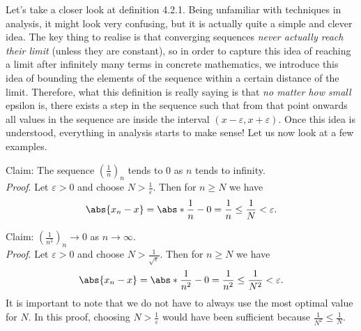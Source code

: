 \documentclass[../real_analysis.tex]{subfiles}
\begin{document}
            Let's take a closer look at definition 4.2.1. Being unfamiliar with techniques in analysis, it might look very confusing, but it is actually quite a simple and clever idea. The key thing to realise is that converging sequences \textit{never actually reach their limit} (unless they are constant), so in order to capture this idea of reaching a limit after infinitely many terms in concrete mathematics, we introduce this idea of bounding the elements of the sequence within a certain distance of the limit. Therefore, what this definition is really saying is that \textit{no matter how small} epsilon is, there exists a step in the sequence such that from that point onwards all values in the sequence are inside the interval $(x-\varepsilon,x+\varepsilon)$.
            Once this idea is understood, everything in analysis starts to make sense! Let us now look at a few examples.
            \begin{example}
                Claim: The sequence $\left(\frac{1}{n}\right)_n$ tends to 0 as $n$ tends to infinity.\\
                \textit{Proof}. Let $\varepsilon>0$ and choose $N>\frac{1}{\varepsilon}$. Then for $n\geq N$ we have
                \begin{equation}
                    \abs{x_n-x}=\abs*{\frac{1}{n}-0}=\frac{1}{n}\leq\frac{1}{N}<\varepsilon.
                \end{equation}
            \end{example}
            \begin{example}
                Claim: $\left(\frac{1}{n^2}\right)_n\to0$ as $n\to\infty$.\\
                \textit{Proof}. Let $\varepsilon>0$ and choose $N>\frac{1}{\sqrt{\varepsilon}}$. Then for $n\geq N$ we have
                \begin{equation}
                    \abs{x_n-x}=\abs*{\frac{1}{n^2}-0}=\frac{1}{n^2}\leq\frac{1}{N^2}<\varepsilon.
                \end{equation}
                It is important to note that we do not have to always use the most optimal value for $N$. In this proof, choosing $N>\frac{1}{\varepsilon}$ would have been sufficient because $\frac{1}{N^2}\leq\frac{1}{N}$.
            \end{example}
\end{document}
